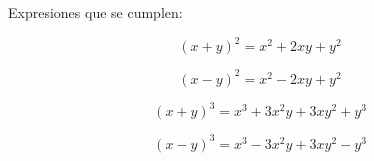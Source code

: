 \begin{frame}

Expresiones que se cumplen:

$$
(x+y)^2 = x^2 + 2xy + y^2
$$

$$
(x-y)^2 = x^2 - 2xy + y^2
$$

$$
(x+y)^3 = x^3 + 3x^2y + 3xy^2 +  y^3
$$

$$
(x-y)^3 = x^3 - 3x^2y + 3xy^2 -  y^3
$$

\end{frame}

